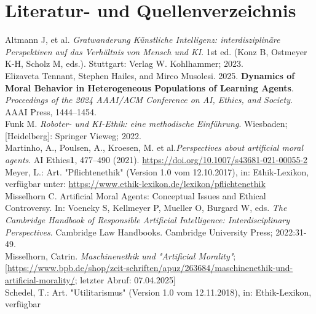 \section{Literatur- und Quellenverzeichnis}\label{sec::literaturverzeichnis}

Altmann J, et al.
\textit{Gratwanderung Künstliche Intelligenz: interdisziplinäre Perspektiven auf das Verhältnis von Mensch und KI}.
1st ed.
(Konz B, Ostmeyer K-H, Scholz M, eds.). Stuttgart: Verlag W. Kohlhammer; 2023. \\
\newline
Elizaveta Tennant, Stephen Hailes, and Mirco Musolesi. 2025.
\textbf{Dynamics of Moral Behavior in Heterogeneous Populations of Learning Agents}.
\textit{Proceedings of the 2024 AAAI/ACM Conference on AI, Ethics, and Society}.
AAAI Press, 1444–1454. \\
\newline
Funk M.
\textit{Roboter- und KI-Ethik: eine methodische Einführung}.
Wiesbaden; [Heidelberg]: Springer Vieweg; 2022. \\
\newline
Martinho, A., Poulsen, A., Kroesen, M. et al.\textit{Perspectives about artificial moral agents}.
AI Ethics\textbf{1}, 477–490 (2021).
\href{https://doi.org/10.1007/s43681-021-00055-2}{https://doi.org/10.1007/s43681-021-00055-2} \\
\newline
Meyer, L.: Art.
"Pflichtenethik" (Version 1.0 vom 12.10.2017), in: Ethik-Lexikon, verfügbar unter:
\href{https://www.ethik-lexikon.de/lexikon/pflichtenethik}{https://www.ethik-lexikon.de/lexikon/pflichtenethik} \\
\newline
Misselhorn C. Artificial Moral Agents:
Conceptual Issues and Ethical Controversy.
In: Voeneky S, Kellmeyer P, Mueller O, Burgard W, eds.
\textit{The Cambridge Handbook of Responsible Artificial Intelligence: Interdisciplinary Perspectives}.
Cambridge Law Handbooks.
Cambridge University Press; 2022:31-49. \\
\newline
Misselhorn, Catrin.
\textit{Maschinenethik und "Artificial Morality"};
[\href{https://www.bpb.de/shop/zeitschriften/apuz/263684/maschinenethik-und-artificial-morality/}{https://www.bpb.de/shop/zeit-schriften/apuz/263684/maschinenethik-und-artificial-morality/};
letzter Abruf: 07.04.2025] \\
\newline
Schedel, T.: Art.
"Utilitarismus" (Version 1.0 vom 12.11.2018), in: Ethik-Lexikon, verfügbar
